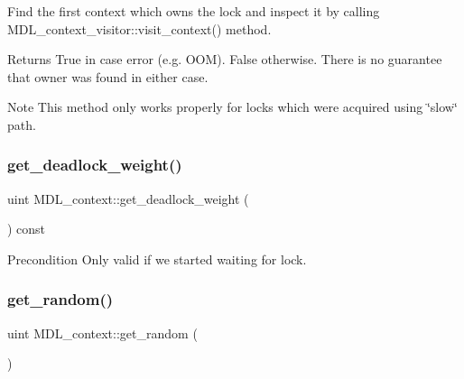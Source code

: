 Find the first context which owns the lock and inspect it by calling M\+D\+L\+\_\+context\+\_\+visitor\+::visit\+\_\+context() method.

\begin{DoxyReturn}{Returns}
True in case error (e.\+g. O\+OM). False otherwise. There is no guarantee that owner was found in either case. 
\end{DoxyReturn}
\begin{DoxyNote}{Note}
This method only works properly for locks which were acquired using \char`\"{}slow\char`\"{} path. 
\end{DoxyNote}
\mbox{\label{classMDL__context_a3563d6d05aeb758f495f44c123c5306b}} 
\subsubsection{\texorpdfstring{get\+\_\+deadlock\+\_\+weight()}{get\_deadlock\_weight()}}
{\footnotesize\ttfamily uint M\+D\+L\+\_\+context\+::get\+\_\+deadlock\+\_\+weight (\begin{DoxyParamCaption}{ }\end{DoxyParamCaption}) const\hspace{0.3cm}{\ttfamily [inline]}}

\begin{DoxyPrecond}{Precondition}
Only valid if we started waiting for lock. 
\end{DoxyPrecond}
\mbox{\label{classMDL__context_a6023ebdf937cfcbf9991b10945ad952f}} 
\subsubsection{\texorpdfstring{get\+\_\+random()}{get\_random()}}
{\footnotesize\ttfamily uint M\+D\+L\+\_\+context\+::get\+\_\+random (\begin{DoxyParamCaption}{ }\end{DoxyParamCaption})\hspace{0.3cm}{\ttfamily [inline]}}

